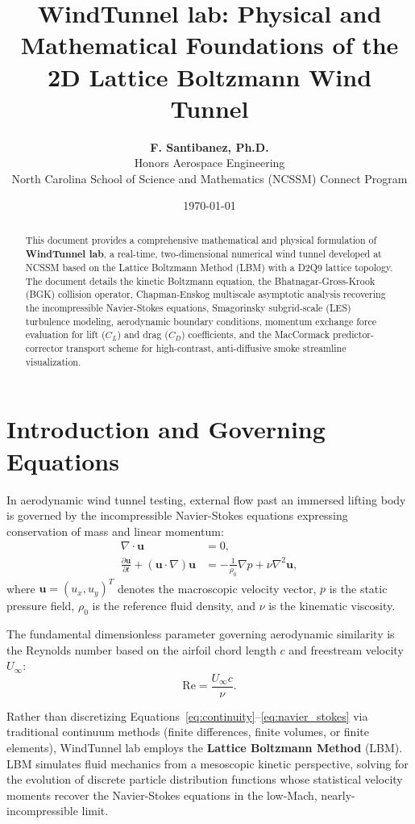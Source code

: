 \documentclass[11pt,a4paper]{article}
\title{\textbf{WindTunnel lab: Physical and Mathematical Foundations of the 2D Lattice Boltzmann Wind Tunnel}}
\author{\textbf{F. Santibanez, Ph.D.} \\ Honors Aerospace Engineering \\ North Carolina School of Science and Mathematics (NCSSM) Connect Program}
\date{\today}
\begin{document}
\maketitle

\begin{abstract}
This document provides a comprehensive mathematical and physical formulation of \textbf{WindTunnel lab}, a real-time, two-dimensional numerical wind tunnel developed at NCSSM based on the Lattice Boltzmann Method (LBM) with a D2Q9 lattice topology. The document details the kinetic Boltzmann equation, the Bhatnagar-Gross-Krook (BGK) collision operator, Chapman-Enskog multiscale asymptotic analysis recovering the incompressible Navier-Stokes equations, Smagorinsky subgrid-scale (LES) turbulence modeling, aerodynamic boundary conditions, momentum exchange force evaluation for lift ($C_L$) and drag ($C_D$) coefficients, and the MacCormack predictor-corrector transport scheme for high-contrast, anti-diffusive smoke streamline visualization.
\end{abstract}

\tableofcontents
\newpage

\section{Introduction and Governing Equations}

In aerodynamic wind tunnel testing, external flow past an immersed lifting body is governed by the incompressible Navier-Stokes equations expressing conservation of mass and linear momentum:
\begin{align}
\nabla \cdot \mathbf{u} &= 0, \label{eq:continuity} \\
\frac{\partial \mathbf{u}}{\partial t} + (\mathbf{u} \cdot \nabla)\mathbf{u} &= -\frac{1}{\rho_0} \nabla p + \nu \nabla^2 \mathbf{u}, \label{eq:navier_stokes}
\end{align}
where $\mathbf{u} = (u_x, u_y)^T$ denotes the macroscopic velocity vector, $p$ is the static pressure field, $\rho_0$ is the reference fluid density, and $\nu$ is the kinematic viscosity.

The fundamental dimensionless parameter governing aerodynamic similarity is the Reynolds number based on the airfoil chord length $c$ and freestream velocity $U_\infty$:
\begin{equation}
\mathrm{Re} = \frac{U_\infty c}{\nu}.
\end{equation}

Rather than discretizing Equations~\eqref{eq:continuity}--\eqref{eq:navier_stokes} via traditional continuum methods (finite differences, finite volumes, or finite elements), WindTunnel lab employs the \textbf{Lattice Boltzmann Method} (LBM). LBM simulates fluid mechanics from a mesoscopic kinetic perspective, solving for the evolution of discrete particle distribution functions whose statistical velocity moments recover the Navier-Stokes equations in the low-Mach, nearly-incompressible limit.
\end{document}
